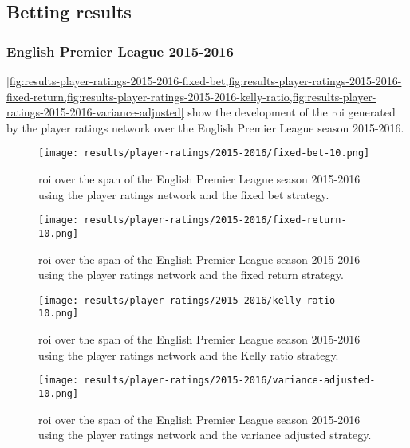 \subsection{Betting results}

\subsubsection{English Premier League 2015-2016}

\cref{fig:results-player-ratings-2015-2016-fixed-bet,fig:results-player-ratings-2015-2016-fixed-return,fig:results-player-ratings-2015-2016-kelly-ratio,fig:results-player-ratings-2015-2016-variance-adjusted} show the development of the \gls{roi} generated by the player ratings network over the English Premier League season 2015-2016.
\begin{figure}
    \centering
    \texttt{[image: results/player-ratings/2015-2016/fixed-bet-10.png]}
    \caption{\gls{roi} over the span of the English Premier League season 2015-2016 using the player ratings network and the fixed bet strategy.}
    \label{fig:results-player-ratings-2015-2016-fixed-bet}
\end{figure}
\begin{figure}
    \centering
    \texttt{[image: results/player-ratings/2015-2016/fixed-return-10.png]}
    \caption{\gls{roi} over the span of the English Premier League season 2015-2016 using the player ratings network and the fixed return strategy.}
    \label{fig:results-player-ratings-2015-2016-fixed-return}
\end{figure}
\begin{figure}
    \centering
    \texttt{[image: results/player-ratings/2015-2016/kelly-ratio-10.png]}
    \caption{\gls{roi} over the span of the English Premier League season 2015-2016 using the player ratings network and the Kelly ratio strategy.}
    \label{fig:results-player-ratings-2015-2016-kelly-ratio}
\end{figure}
\begin{figure}
    \centering
    \texttt{[image: results/player-ratings/2015-2016/variance-adjusted-10.png]}
    \caption{\gls{roi} over the span of the English Premier League season 2015-2016 using the player ratings network and the variance adjusted strategy.}
    \label{fig:results-player-ratings-2015-2016-variance-adjusted}
\end{figure}

